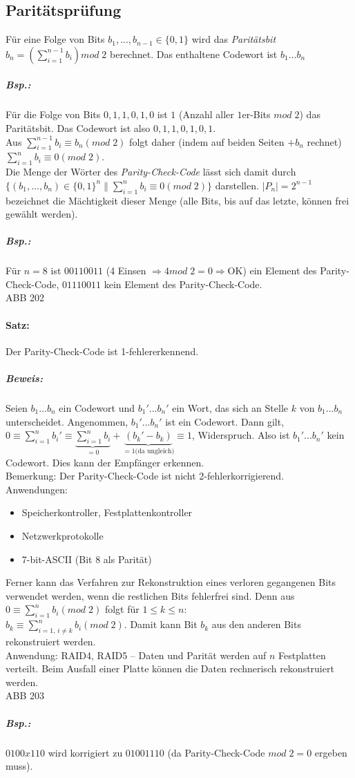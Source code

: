 \subsection{Paritätsprüfung}
Für eine Folge von Bits $b_1,...,b_{n-1}\in \{0,1\}$ wird das \emph{Paritätsbit} $b_n= \left( \sum_{i=1}^{n-1}b_i\right) mod \; 2$ berechnet. Das enthaltene Codewort ist $b_1...b_n$
\subparagraph{Bsp.:} Für die Folge von Bits $0,1,1,0,1,0$ ist $1$ (Anzahl aller $1$er-Bits $mod\;2$) das Paritätsbit. Das Codewort ist also $0,1,1,0,1,0,1$.\medskip\\
Aus $\sum_{i=1}^{n-1}b_i\equiv b_n (mod\; 2)$ folgt daher (indem auf beiden Seiten $+b_n$ rechnet) $\sum_{i=1}^{n}b_i \equiv 0 (mod\;2)$.\\
Die Menge der Wörter des \emph{Parity-Check-Code} lässt sich damit durch $\{(b_1,...,b_n)\in \{0,1\}^n\|\sum_{i=1}^{n}b_i\equiv 0 (mod\; 2)\}$ darstellen. $|P_n|=2^{n-1}$ bezeichnet die Mächtigkeit dieser Menge (alle Bits, bis auf das letzte, können frei gewählt werden).
\subparagraph{Bsp.:} Für $n=8$ ist $00110011$ (4 Einsen $\Rightarrow 4mod \;2=0 \Rightarrow$OK) ein Element des Parity-Check-Code, $01110011$ kein Element des Parity-Check-Code.\\
ABB 202
\paragraph{Satz:} Der Parity-Check-Code ist 1-fehlererkennend.
\subparagraph{Beweis:} Seien $b_1...b_n$ ein Codewort und $b_1'...b_n'$ ein Wort, das sich an Stelle $k$ von $b_1...b_n$ unterscheidet. Angenommen, $b_1'...b_n'$ ist ein Codewort. Dann gilt, $0\equiv \sum_{i=1}^{n}b_i'\equiv \underbrace{\sum_{i=1}^{n}b_i}_{=0}+\underbrace{(b_k'-b_k)}_{=1 \text{(da ungleich)}}\equiv 1$, Widerspruch. Also ist $b_1'...b_n'$ kein Codewort. Dies kann der Empfänger erkennen.\\
Bemerkung: Der Parity-Check-Code ist nicht 2-fehlerkorrigierend.\\
Anwendungen: 
\begin{itemize}
\item Speicherkontroller, Festplattenkontroller
\item Netzwerkprotokolle
\item 7-bit-ASCII (Bit 8 als Parität)
\end{itemize}
Ferner kann das Verfahren zur Rekonstruktion eines verloren gegangenen Bits verwendet werden, wenn die restlichen Bits fehlerfrei sind. Denn aus $0\equiv \sum_{i=1}^{n} b_i (mod\;2)$ folgt für $1\leq k \leq n$: \\
$b_k\equiv \sum_{i=1,\, i\not =k}^{n} b_i (mod\;2)$. Damit kann Bit $b_k$ aus den anderen Bits rekonstruiert werden.\\
Anwendung: RAID4, RAID5 -- Daten und Parität werden auf $n$ Festplatten verteilt. Beim Ausfall einer Platte können die Daten rechnerisch rekonstruiert werden.\\
ABB 203
\subparagraph{Bsp.:} $0100x110$ wird korrigiert zu $01001110$ (da Parity-Check-Code $mod\;2=0$ ergeben muss).

